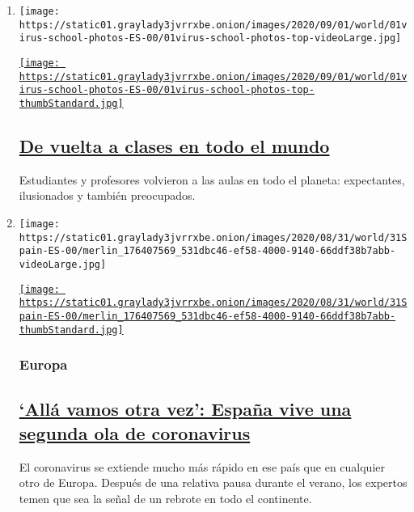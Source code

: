\begin{enumerate}
\def\labelenumi{\arabic{enumi}.}
\item
  \texttt{[image: https://static01.graylady3jvrrxbe.onion/images/2020/09/01/world/01virus-school-photos-ES-00/01virus-school-photos-top-videoLarge.jpg]}

  \href{/es/2020/09/01/espanol/mundo/vuelta-a-clases-coronavirus.html}{\texttt{[image: https://static01.graylady3jvrrxbe.onion/images/2020/09/01/world/01virus-school-photos-ES-00/01virus-school-photos-top-thumbStandard.jpg]}}

  \hypertarget{de-vuelta-a-clases-en-todo-el-mundo}{%
  \subsection{\texorpdfstring{\href{/es/2020/09/01/espanol/mundo/vuelta-a-clases-coronavirus.html}{De
  vuelta a clases en todo el
  mundo}}{De vuelta a clases en todo el mundo}}\label{de-vuelta-a-clases-en-todo-el-mundo}}

  Estudiantes y profesores volvieron a las aulas en todo el planeta:
  expectantes, ilusionados y también preocupados.
\item
  \texttt{[image: https://static01.graylady3jvrrxbe.onion/images/2020/08/31/world/31Spain-ES-00/merlin\_176407569\_531dbc46-ef58-4000-9140-66ddf38b7abb-videoLarge.jpg]}

  \href{/es/2020/08/31/espanol/mundo/rebrote-espana.html}{\texttt{[image: https://static01.graylady3jvrrxbe.onion/images/2020/08/31/world/31Spain-ES-00/merlin\_176407569\_531dbc46-ef58-4000-9140-66ddf38b7abb-thumbStandard.jpg]}}

  \hypertarget{europa}{%
  \subsubsection{Europa}\label{europa}}

  \hypertarget{alluxe1-vamos-otra-vez-espauxf1a-vive-una-segunda-ola-de-coronavirus}{%
  \subsection{\texorpdfstring{\href{/es/2020/08/31/espanol/mundo/rebrote-espana.html}{`Allá
  vamos otra vez': España vive una segunda ola de
  coronavirus}}{`Allá vamos otra vez': España vive una segunda ola de coronavirus}}\label{alluxe1-vamos-otra-vez-espauxf1a-vive-una-segunda-ola-de-coronavirus}}

  El coronavirus se extiende mucho más rápido en ese país que en
  cualquier otro de Europa. Después de una relativa pausa durante el
  verano, los expertos temen que sea la señal de un rebrote en todo el
  continente.


\end{enumerate}
